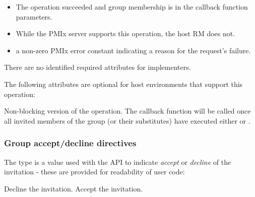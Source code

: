 \begin{itemize}
\item {} The operation succeeded and group membership is in the callback function parameters.
\item {} While the \ac{PMIx} server supports this operation, the host \ac{RM} does not.
\item a non-zero \ac{PMIx} error constant indicating a reason for the request's failure.
\end{itemize}


\reqattrstart
There are no identified required attributes for implementers.

\reqattrend

\optattrstart
The following attributes are optional for host environments that support this operation:


\optattrend

\descr

Non-blocking version of the  operation. The callback function will be called once all invited members of the group (or their substitutes) have executed either  or .

\subsubsection{Group accept/decline directives}

The  type is a  value used with the  \ac{API} to indicate \emph{accept} or \emph{decline} of the invitation - these are provided for readability of user code:

\begin{constantdesc}
%
Decline the invitation.
%
Accept the invitation.
%
\end{constantdesc}


\subsection{}

\summary

